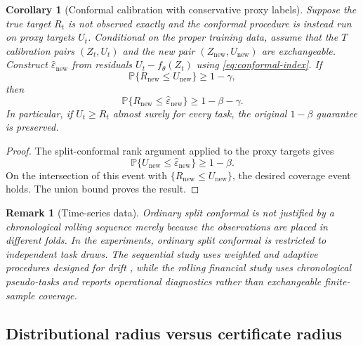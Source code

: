 \documentclass[11pt]{article}
\newtheorem{corollary}[theorem]{Corollary}
\newtheorem{remark}[theorem]{Remark}
\newcommand{\Prob}{\mathbb{P}}
\newcommand{\1}{\mathbf{1}}
\begin{document}
\begin{corollary}[Conformal calibration with conservative proxy labels]\label{cor:conformal-proxy}
Suppose the true target $R_t$ is not observed exactly and the conformal procedure is instead run on proxy targets $U_t$. Conditional on the proper training data, assume that the $T$ calibration pairs $(Z_t,U_t)$ and the new pair $(Z_{\mathrm{new}},U_{\mathrm{new}})$ are exchangeable. Construct $\widehat\varepsilon_{\mathrm{new}}$ from residuals $U_t-f_\theta(Z_t)$ using \eqref{eq:conformal-index}. If
\begin{equation}
    \Prob\{R_{\mathrm{new}}\le U_{\mathrm{new}}\}\ge1-\gamma,
\end{equation}
then
\begin{equation}
    \Prob\{R_{\mathrm{new}}\le\widehat\varepsilon_{\mathrm{new}}\}
    \ge1-\beta-\gamma.
\end{equation}
In particular, if $U_t\ge R_t$ almost surely for every task, the original $1-\beta$ guarantee is preserved.
\end{corollary}

\begin{proof}
The split-conformal rank argument applied to the proxy targets gives
\begin{equation}
    \Prob\{U_{\mathrm{new}}\le\widehat\varepsilon_{\mathrm{new}}\}\ge1-\beta.
\end{equation}
On the intersection of this event with $\{R_{\mathrm{new}}\le U_{\mathrm{new}}\}$, the desired coverage event holds. The union bound proves the result.
\end{proof}

\begin{remark}[Time-series data]
Ordinary split conformal is not justified by a chronological rolling sequence merely because the observations are placed in different folds. In the experiments, ordinary split conformal is restricted to independent task draws. The sequential study uses weighted and adaptive procedures designed for drift \citep{barber2023conformal,gibbs2021adaptive}, while the rolling financial study uses chronological pseudo-tasks and reports operational diagnostics rather than exchangeable finite-sample coverage.
\end{remark}

\subsection{Distributional radius versus certificate radius}
\end{document}
